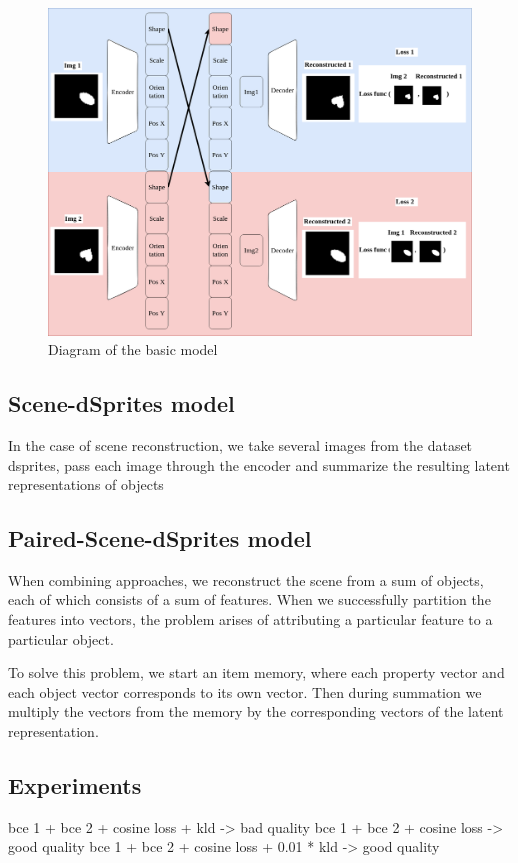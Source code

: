 \documentclass{article}
\begin{document}
    \begin{figure}[ht]
        \centering
        \includegraphics[width=\linewidth]{img/model/paired_dsprites_model}
        \caption{Diagram of the basic model}
        \label{fig:paired_dsprites_model}

    \end{figure}

    \subsection{Scene-dSprites model}

    In the case of scene reconstruction, we take several images from the dataset
    dsprites, pass each image through the encoder and summarize the resulting
    latent representations of objects

    \subsection{Paired-Scene-dSprites model}
    When combining approaches, we reconstruct the scene from a sum of objects,
    each of which consists of a sum of features. When we successfully partition
    the features into vectors, the problem arises of attributing a particular
    feature to a particular object.

    To solve this problem, we start an item memory, where each property vector
    and each object vector corresponds to its own vector.
    Then during summation we multiply the vectors from the memory by the corresponding
    vectors of the latent representation.

    \subsection{Experiments}

    bce 1 + bce 2 + cosine loss + kld  -> bad quality
    bce 1 + bce 2 + cosine loss -> good quality
    bce 1 + bce 2 + cosine loss + 0.01 * kld -> good quality
\end{document}
